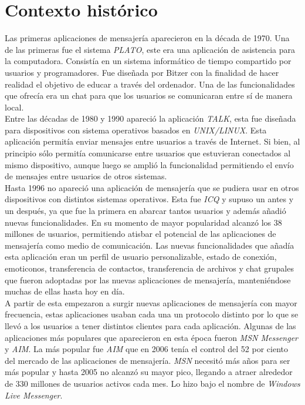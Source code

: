 \section{Contexto histórico}
Las primeras aplicaciones de mensajería aparecieron en la década de 1970. Una de las primeras fue el sistema \emph{PLATO}, este era una aplicación de asistencia para la computadora. Consistía en un sistema informático de tiempo compartido por usuarios y programadores. Fue diseñada por Bitzer con la finalidad de hacer realidad el objetivo de educar a través del ordenador. Una de las funcionalidades que ofrecía era un chat para que los usuarios se comunicaran entre sí de manera local.\\ 
Entre las décadas de 1980 y 1990 apareció la aplicación \emph{TALK}, esta fue diseñada para dispositivos con sistema operativos basados en \emph{UNIX/LINUX}. Esta aplicación permitía enviar mensajes entre usuarios a través de Internet. Si bien, al principio sólo permitía comunicarse entre usuarios que estuvieran conectados al mismo dispositivo, aunque luego se amplió la funcionalidad permitiendo el envío de mensajes entre usuarios de otros sistemas.\\
Hasta 1996 no apareció una aplicación de mensajería que se pudiera usar en otros dispositivos con distintos sistemas operativos. 
Esta fue \emph{ICQ} y supuso un antes y un después, ya que fue la primera en abarcar tantos usuarios y además añadió nuevas funcionalidades. En su momento de mayor popularidad alcanzó los 38 millones de usuarios, permitiendo atisbar el potencial de las aplicaciones de mensajería como medio de comunicación.
Las nuevas funcionalidades que añadía esta aplicación eran un perfil de usuario personalizable, estado de conexión, emoticonos, transferencia de contactos, transferencia de archivos y chat grupales que fueron adoptadas por las nuevas aplicaciones de mensajería, manteniéndose muchas de ellas hasta hoy en día.\\
A partir de esta empezaron a surgir nuevas aplicaciones de mensajería con mayor frecuencia, estas aplicaciones usaban cada una un protocolo distinto por lo que se llevó a los usuarios a tener distintos clientes para cada aplicación.
Algunas de las aplicaciones más populares que aparecieron en esta época fueron \emph{MSN Messenger} y \emph{AIM}. La más popular fue \emph{AIM} que en 2006 tenía el control del 52 por ciento del mercado de las aplicaciones de mensajería. \emph{MSN} necesitó más años para ser más popular y hasta 2005 no alcanzó su mayor pico, llegando a atraer alrededor de 330 millones de usuarios activos cada mes. Lo hizo bajo el nombre de \emph{Windows Live Messenger}.\\ 
